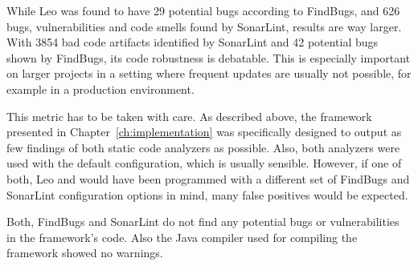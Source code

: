 While Leo was found to have 29 potential bugs according to FindBugs, and 626 bugs, vulnerabilities and code smells found by SonarLint, \uimaas{} results are way larger. With 3854 bad code artifacts identified by SonarLint and 42 potential bugs shown by FindBugs, its code robustness is debatable. This is especially important on larger projects in a setting where frequent updates are usually not possible, for example in a production environment.

This metric has to be taken with care. As described above, the framework presented in Chapter~\ref{ch:implementation} was specifically designed to output as few findings of both static code analyzers as possible. Also, both analyzers were used with the default configuration, which is usually sensible. However, if one of both, Leo and \uimaas{} would have been programmed with a different set of FindBugs and SonarLint configuration options in mind, many false positives would be expected.

Both, FindBugs and SonarLint do not find any potential bugs or vulnerabilities in the framework's code. Also the Java compiler used for compiling the framework showed no warnings.

